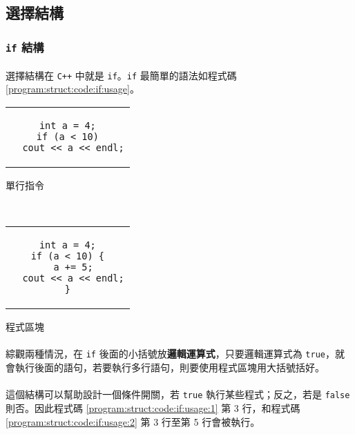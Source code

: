 \documentclass[12pt,a4paper,oneside]{report}
\begin{document}
\begin{CJK}{UTF8}{bkai}
\subsection{選擇結構}
\subsubsection{\lstinline!if! 結構}

\paragraph{}選擇結構在 \texttt{C++} 中就是 \lstinline!if!。\lstinline!if! 最簡單的語法如程式碼 \ref{program:struct:code:if:usage}。

\begin{code}[h!]
\centering
\begin{subcode}{.4\textwidth}
  \centering
  \begin{tabular}{c}
  \begin{lstlisting}
int a = 4;
if (a < 10)
  cout << a << endl;
  \end{lstlisting}
  \end{tabular}
  \caption{單行指令}
  \label{program:struct:code:if:usage:1}
\end{subcode}
~
\begin{subcode}{.4\textwidth}
  \centering
  \begin{tabular}{c}
  \begin{lstlisting}
int a = 4;
if (a < 10) {
  a += 5;
  cout << a << endl;
}
  \end{lstlisting}
  \end{tabular}
  \caption{程式區塊}
  \label{program:struct:code:if:usage:2}
\end{subcode}
\caption{\lstinline!if! 的用法}
\label{program:struct:code:if:usage}
\end{code}

\paragraph{}綜觀兩種情況，在 \lstinline!if! 後面的小括號放\textbf{邏輯運算式}，只要邏輯運算式為 \lstinline!true!，就會執行後面的語句，若要執行多行語句，則要使用程式區塊用大括號括好。
\paragraph{}這個結構可以幫助設計一個條件開關，若 \lstinline!true! 執行某些程式；反之，若是 \lstinline!false! 則否。因此程式碼 \ref{program:struct:code:if:usage:1} 第 3 行，和程式碼 \ref{program:struct:code:if:usage:2} 第 3 行至第 5 行會被執行。


\end{CJK}
\end{document}
